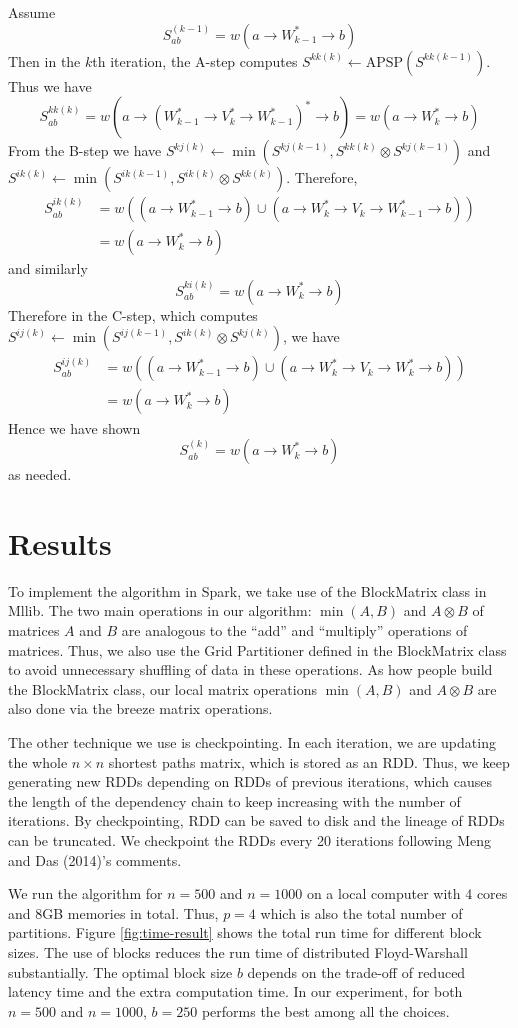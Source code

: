 \documentclass{article} %
\begin{document}
Assume
\[
S^{(k-1)}_{ab} = w(a \to W_{k-1}^* \to b)
\]
Then in the $k$th iteration, the A-step computes
$S^{kk(k)} \leftarrow \text{APSP}(S^{kk(k-1)})$.
Thus we have
\[
S^{kk(k)}_{ab} = w(a \to (W_{k-1}^* \to V_k^* \to W_{k-1}^*)^* \to b) = w(a \to W_k^* \to b)
\]
From the B-step we have
 $S^{kj(k)} \leftarrow \min(S^{kj(k-1)}, S^{kk(k)} \otimes S^{kj(k-1)})$ 
and 
$S^{ik(k)} \leftarrow \min(S^{ik(k-1)}, S^{ik(k)} \otimes S^{kk(k)})$.
Therefore,
\begin{align*}
S^{ik(k)}_{ab} &= w((a \to W_{k-1}^* \to b) \cup (a \to W_k^* \to V_k \to W_{k-1}^* \to b))\\
&= w(a \to W_k^* \to b)
\end{align*}
and similarly
\[
S^{ki(k)}_{ab} = w(a \to W_k^* \to b)
\]
Therefore in the C-step, which computes
$S^{ij(k)} \leftarrow \min(S^{ij(k-1)}, S^{ik(k)} \otimes S^{kj(k)})$,
we have
\begin{align*}
S^{ij(k)}_{ab} &= w((a \to W_{k-1}^* \to b) \cup (a \to W_k^* \to V_k \to W_k^* \to b))\\
&= w(a \to W_k^* \to b)
\end{align*}
Hence we have shown
\[
S^{(k)}_{ab} = w(a \to W_k^* \to b)
\]
as needed.

\section{Results}
To implement the algorithm in Spark, we take use of
the BlockMatrix class in Mllib. The two main operations
in our algorithm: $\min(A, B)$ and $A \otimes B$ of matrices
$A$ and $B$ are analogous to the ``add'' and ``multiply''
operations of matrices. Thus, we also use the Grid Partitioner defined in the BlockMatrix class to avoid 
unnecessary shuffling of data in these operations.
As how people build the BlockMatrix class, our local matrix operations $\min(A, B)$ and $A \otimes B$
are also done via the breeze matrix operations.

The other technique we use is checkpointing. In each iteration, we are updating the whole $n \times n$ shortest paths matrix, which is stored as an RDD. Thus, we keep
generating new RDDs depending on RDDs of previous iterations, which causes the length of the dependency chain to keep increasing with the number of iterations.
By checkpointing, RDD can be saved to disk and the lineage of RDDs can be truncated. We checkpoint the RDDs
every 20 iterations following Meng and Das (2014)'s comments. 

We run the algorithm for $n = 500$ and $n = 1000$ 
on a local computer with $4$ cores and $8$GB memories in 
total. Thus, $p = 4$ which is also the total number of partitions. Figure \ref{fig:time-result} shows the total
run time for different block sizes. The use of blocks reduces the run time of distributed Floyd-Warshall substantially. The optimal block size $b$ depends on the trade-off of reduced latency time and the extra computation time. In our experiment, for both $n = 500$
and $n = 1000$, $b = 250$ performs the best among all the
choices.
\end{document}
